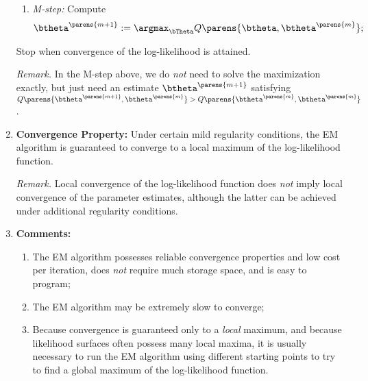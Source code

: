 \documentclass[12pt]{article}
\begin{document}
\begin{enumerate}[label=\textbf{\arabic*.}]
\begin{minipage}{\linewidth}
\begin{algorithm}[H]
\begin{algorithmic}[1]
\begin{enumerate}
				\item \emph{M-step:} Compute 
				\begin{align*}
					\btheta^{\parens{m+1}} := \argmax_{\bTheta} Q \parens{\btheta, \btheta^{\parens{m}}}; 
				\end{align*}
			\end{enumerate}
			
			\STATE Stop when convergence of the log-likelihood is attained. 
		\end{algorithmic} 
	\end{algorithm}
	\end{minipage}
	
	\vspace{10pt}
	
	\textit{Remark.} In the M-step above, we do \emph{not} need to solve the maximization exactly, but just need an estimate $\btheta^{\parens{m+1}}$ satisfying $Q \parens{\btheta^{\parens{m+1}}, \btheta^{\parens{m}}} > Q \parens{\btheta^{\parens{m}}, \btheta^{\parens{m}}}$. 
	
	\item \textbf{Convergence Property:} Under certain mild regularity conditions, the EM algorithm is guaranteed to converge to a local maximum of the log-likelihood function. 
	
	\textit{Remark.} Local convergence of the log-likelihood function does \emph{not} imply local convergence of the parameter estimates, although the latter can be achieved under additional regularity conditions. 
	
	\item \textbf{Comments:} 
	\begin{enumerate}
		\item The EM algorithm possesses reliable convergence properties and low cost per iteration, does \emph{not} require much storage space, and is easy to program; 
		\item The EM algorithm may be extremely slow to converge; 
		\item Because convergence is guaranteed only to a \emph{local} maximum, and because likelihood surfaces often possess many local maxima, it is usually necessary to run the EM algorithm using different starting points to try to find a global maximum of the log-likelihood function. 
	\end{enumerate}
	

\end{enumerate}
\end{document}
